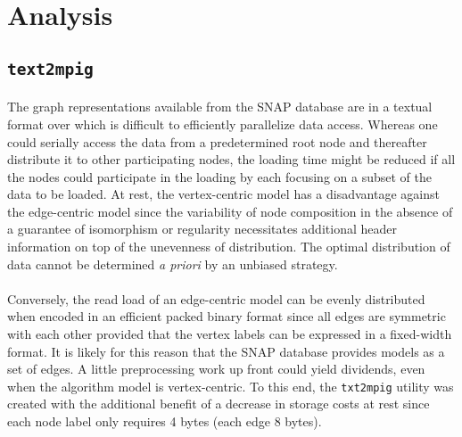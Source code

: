 \documentclass[11pt,epsf]{article}
\begin{document}
\section{Analysis}{
  \subsection{\texttt{text2mpig}}{
    \paragraph{}{
      The graph representations available from the SNAP database\autocite{SNAP} are in a textual format
      over which is difficult to efficiently parallelize data access. Whereas one could serially access
      the data from a predetermined root node and thereafter distribute it to other participating nodes,
      the loading time might be reduced if all the nodes could participate in the loading by each focusing
      on a subset of the data to be loaded. At rest, the vertex-centric model has a disadvantage against
      the edge-centric model since the variability of node composition in the absence of a guarantee of
      isomorphism or regularity necessitates additional header information on top of the unevenness of
      distribution. The optimal distribution of data cannot be determined \emph{a priori} by an unbiased
      strategy.
    }
    \paragraph{}{
      Conversely, the read load of an edge-centric model can be evenly distributed when
      encoded in an efficient packed binary format since all edges are symmetric with each
      other provided that the vertex labels can be expressed in a fixed-width format. It is
      likely for this reason that the SNAP database provides models as a set of edges. A
      little preprocessing work up front could yield dividends, even when the algorithm
      model is vertex-centric. To this end, the \texttt{txt2mpig} utility was created with
      the additional benefit of a decrease in storage costs at rest since each node label
      only requires 4 bytes (each edge 8 bytes).
    }
}}
\end{document}
